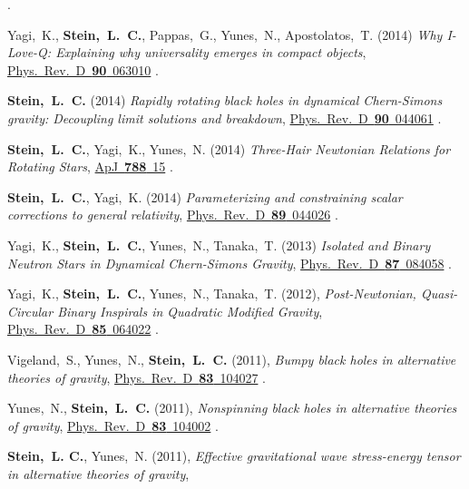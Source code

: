 \begin{etaremune}[start=\value{pubCounter}]
  .
\item
  Yagi,~K., {\bf Stein,~L.~C.}, Pappas,~G., Yunes,~N., Apostolatos,~T.
  (2014)
  {\it Why I-Love-Q: Explaining why universality emerges in compact objects},
  \href{http://dx.doi.org/10.1103/PhysRevD.90.063010}{Phys.~Rev.~D~{\bf 90}~063010}
  .
\item
  {\bf Stein,~L.~C.}
  (2014)
  {\it Rapidly rotating black holes in dynamical Chern-Simons gravity:
    Decoupling limit solutions and breakdown},
  \href{http://dx.doi.org/10.1103/PhysRevD.90.044061}{Phys.~Rev.~D~{\bf 90}~044061}
  .
\item
  {\bf Stein,~L.~C.}, Yagi,~K., Yunes,~N.
  (2014)
  {\it Three-Hair Newtonian Relations for Rotating Stars},
  \href{http://dx.doi.org/10.1088/0004-637X/788/1/15}{ApJ~{\bf 788}~15}
  .
\item
  {\bf Stein,~L.~C.}, Yagi,~K.
  (2014)
  {\it Parameterizing and constraining scalar corrections to general relativity},
  \href{http://dx.doi.org/10.1103/PhysRevD.89.044026}{Phys.~Rev.~D~{\bf 89}~044026}
  .
\item
  Yagi,~K., {\bf Stein,~L.~C.}, Yunes,~N., Tanaka,~T.
  (2013)
  {\it Isolated and Binary Neutron Stars in Dynamical Chern-Simons Gravity},
  \href{http://dx.doi.org/10.1103/PhysRevD.87.084058}{Phys.~Rev.~D~{\bf 87}~084058}
  .
\item
  Yagi,~K., {\bf Stein,~L.~C.}, Yunes,~N., Tanaka,~T.
  (2012),
  {\it Post-Newtonian, Quasi-Circular Binary Inspirals in Quadratic Modified Gravity},
  \href{http://dx.doi.org/10.1103/PhysRevD.85.064022}{Phys.~Rev.~D~{\bf 85}~064022}
  .
\item
  Vigeland,~S., Yunes,~N., {\bf Stein,~L.~C.}
  (2011),
  {\it Bumpy black holes in alternative theories of gravity},
  \href{http://dx.doi.org/10.1103/PhysRevD.83.104027}{Phys.~Rev.~D~{\bf 83}~104027}
  .
\item
  Yunes,~N., {\bf Stein,~L.~C.}
  (2011),
  {\it Nonspinning black holes in alternative theories of gravity},
  \href{http://dx.doi.org/10.1103/PhysRevD.83.104002}{Phys.~Rev.~D~{\bf 83}~104002}
  .
\item
  {\bf Stein,~L. C.}, Yunes,~N.
  (2011),
  {\it Effective gravitational wave stress-energy tensor in
    alternative theories of gravity},

\end{etaremune}
